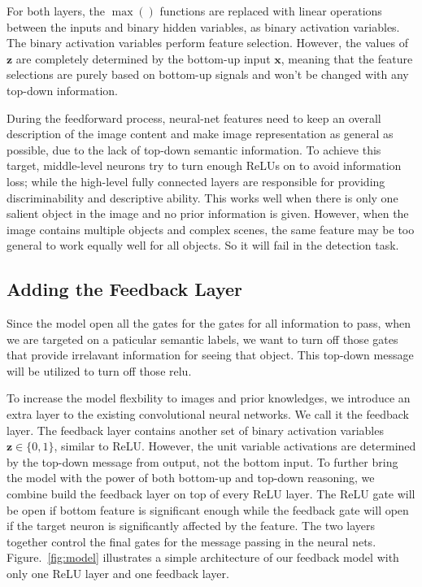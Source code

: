 For both layers, the $\max()$ functions are replaced with linear operations between the inputs and binary hidden variables, as binary activation variables. The binary activation variables perform feature selection. However, the values of $\mathbf{z}$ are completely determined by the bottom-up input $\mathbf{x}$, meaning that the feature selections are purely based on bottom-up signals and won't be changed with any top-down information.

During the feedforward process, neural-net features need to keep an overall description of the image content and make image representation as general as possible, due to the lack of top-down semantic information. To achieve this target, middle-level neurons try to turn enough ReLUs on to avoid information loss; while the high-level fully connected layers are responsible for providing discriminability and descriptive ability. This works well when there is only one salient object in the image and no prior information is given. However, when the image contains multiple objects and complex scenes, the same feature may be too general to work equally well for all objects. So it will fail in the detection task.


\subsection{Adding the Feedback Layer}
Since the model open all the gates for the gates for all information to pass, when we are targeted on a paticular semantic labels, we want to turn off those gates that provide irrelavant information for seeing that object. This top-down message will be utilized to turn off those relu.

To increase the model flexbility to images and prior knowledges, we introduce an extra layer to the existing convolutional neural networks. We call it the feedback layer. The feedback layer contains another set of binary activation variables $\mathbf{z} \in \{0, 1\}$, similar to ReLU. However, the unit variable activations are determined by the top-down message from output, not the bottom input. To further bring the model with the power of both bottom-up and top-down reasoning, we combine build the feedback layer on top of every ReLU layer. The ReLU gate will be open if bottom feature is significant enough while the feedback gate will open if the target neuron is significantly affected by the feature. The two layers together control the final gates for the message passing in the neural nets. Figure.~\ref{fig:model} illustrates a simple architecture of our feedback model with only one ReLU layer and one feedback layer.

